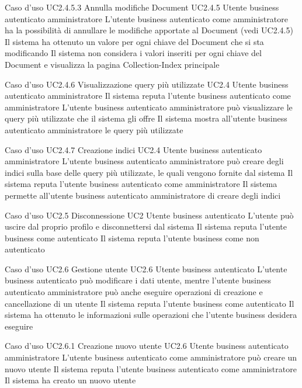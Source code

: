 \UCtitle
{Caso d'uso UC2.4.5.3}
{Annulla modifiche Document}
\UC
{UC2.4.5}
{Utente business autenticato amministratore}
{L'utente business autenticato come amministratore ha la possibilità di annullare le modifiche apportate al Document (vedi UC2.4.5)}
{Il sistema ha ottenuto un valore per ogni chiave del Document che si sta modificando}
\post
{Il sistema non considera i valori inseriti per ogni chiave del Document e visualizza la pagina Collection-Index principale}

\UCtitle
{Caso d'uso UC2.4.6}
{Visualizzazione query più utilizzate}
\UC
{UC2.4}
{Utente business autenticato amministratore}
{Il sistema reputa l'utente business autenticato come amministratore}
{L'utente business autenticato amministratore può visualizzare le query più utilizzate che il sistema gli offre}
\post
{Il sistema mostra all'utente business autenticato amministratore le query più utilizzate}

\UCtitle
{Caso d'uso UC2.4.7}
{Creazione indici}
\UC
{UC2.4}
{Utente business autenticato amministratore}
{L'utente business autenticato amministratore può creare degli indici sulla base delle query più utilizzate, le quali vengono fornite dal sistema}
{Il sistema reputa l'utente business autenticato come amministratore}
\post
{Il sistema permette all'utente business autenticato amministratore di creare degli indici}

\UCtitle
{Caso d'uso UC2.5}
{Disconnessione}
\UC
{UC2}
{Utente business autenticato}
{L'utente può uscire dal proprio profilo e disconnettersi dal sistema}
{Il sistema reputa l'utente business come autenticato}
\post
{Il sistema reputa l'utente business come non autenticato}

\UCtitle
{Caso d'uso UC2.6}
{Gestione utente}
\UC
{UC2.6}
{Utente business autenticato}
{L'utente business autenticato può modificare i dati utente, mentre l'utente business autenticato amministratore può anche eseguire operazioni di creazione e cancellazione di un utente}
{Il sistema reputa l'utente business come autenticato}
\post
{Il sistema ha ottenuto le informazioni sulle operazioni che l'utente business desidera eseguire}

\UCtitle
{Caso d'uso UC2.6.1}
{Creazione nuovo utente}
\UC
{UC2.6}
{Utente business autenticato amministratore}
{L'utente business autenticato come amministratore può creare un nuovo utente}
{Il sistema reputa l'utente business autenticato come amministratore}
\post
{Il sistema ha creato un nuovo utente}


